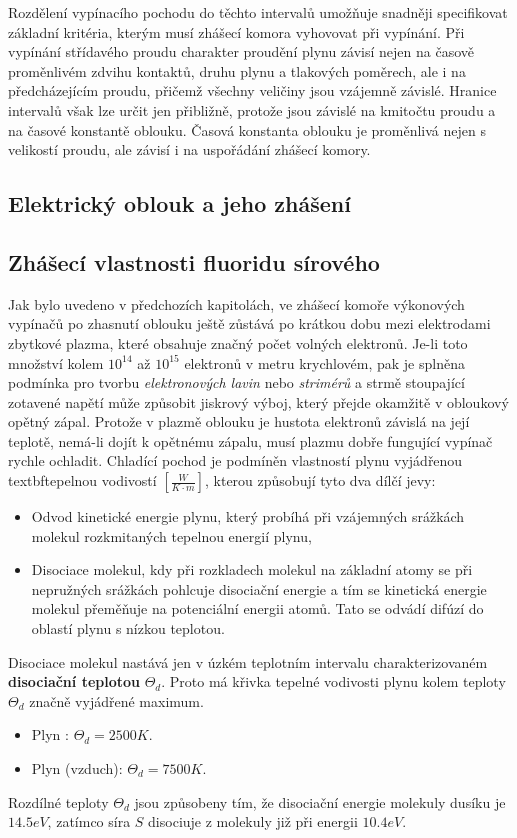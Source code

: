       Rozdělení vypínacího pochodu do těchto intervalů umožňuje snadněji specifikovat základní kritéria, 
      kterým musí zhášecí komora vyhovovat při vypínání. Při vypínání střídavého proudu charakter proudění 
      plynu závisí nejen na časově proměnlivém zdvihu kontaktů, druhu plynu a tlakových poměrech, ale i na 
      předcházejícím proudu, přičemž všechny veličiny jsou vzájemně závislé. Hranice intervalů však lze určit 
      jen přibližně, protože jsou závislé na kmitočtu proudu a na časové konstantě oblouku. Časová konstanta 
      oblouku je proměn\-livá nejen s velikostí proudu, ale závisí i na uspořádání zhášecí komory.

  \subsection{Elektrický oblouk a jeho zhášení}
  \subsection{Zhášecí vlastnosti fluoridu sírového}
    Jak bylo uvedeno v předchozích kapitolách, ve zhášecí komoře vý\-ko\-no\-vých vypínačů po zhasnutí 
    oblouku ještě zůstává po krátkou dobu mezi elektrodami zbytkové plazma, které obsahuje značný počet 
    volných elektronů. Je-li toto množství kolem $10^{14}$ až $10^{15}$ elektronů v metru krychlovém, pak je 
    splněna podmínka pro tvorbu \emph{elektronových lavin} nebo \emph{strimérů} a strmě stoupající zotavené 
    napětí může způsobit jiskrový výboj, který přejde okamžitě v obloukový opětný zápal. Protože v plazmě 
    oblouku je hustota elektronů závislá na její teplotě, nemá-li dojít k opětnému zápalu, musí plazmu dobře 
    fungující vypínač rychle ochladit. Chladící  pochod je podmíněn vlastností plynu vyjádřenou 
    \\textbf{tepelnou vodivostí}
    $[\frac{W}{K\cdot m}]$,  kterou způsobují tyto dva dílčí jevy:
    \begin{itemize}
     \item Odvod kinetické energie plynu, který probíhá při vzájemných srážkách molekul rozkmitaných tepelnou 
           energií plynu,
     \item Disociace molekul, kdy při rozkladech molekul na základní atomy se při ne\-pru\-žných
           srážkách pohlcuje disociační energie a tím se kinetická energie molekul pře\-mě\-ňu\-je
           na potenciální energii atomů. Tato se odvádí difúzí do oblastí plynu s nízkou teplotou.
    \end{itemize}
    Disociace molekul nastává jen v úzkém teplotním intervalu charakterizovaném \textbf{disociační teplotou} 
    $\Theta_d$. Proto má křivka tepelné vodivosti plynu kolem teploty $\Theta_d$ značně vyjádřené maximum.
    \begin{itemize}
      \item Plyn : $\Theta_d = 2500 K$.
      \item Plyn  (vzduch): $\Theta_d = 7500 K$.
    \end{itemize}
    Rozdílné teploty $\Theta_d$ jsou způsobeny tím, že disociační energie molekuly dusíku 
    je $14.5 eV$, zatímco síra $S$ disociuje z molekuly  již při energii $10.4 eV$.
   
